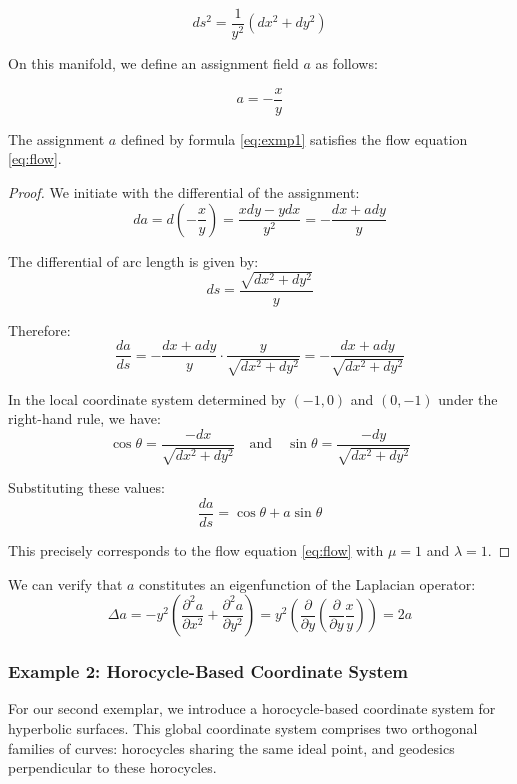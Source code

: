 $$
ds^2 = \frac{1}{y^2} (dx^2 + dy^2)
$$

On this manifold, we define an assignment field $a$ as follows:

\begin{equation}\label{eq:exmp1}
a = - \frac{x}{y}
\end{equation}

\begin{theorem}\label{thm:exmp1}
The assignment $a$ defined by formula \eqref{eq:exmp1} satisfies the flow equation \eqref{eq:flow}.
\end{theorem}

\begin{proof}
We initiate with the differential of the assignment:
$$
da = d\left(-\frac{x}{y}\right) = \frac{xdy - ydx}{y^2} = -\frac{dx + ady}{y}
$$

The differential of arc length is given by:
$$
ds = \frac{\sqrt{dx^2 + dy^2}}{y}
$$

Therefore:
$$
\frac{da}{ds} = - \frac{dx + ady}{y} \cdot \frac{y}{\sqrt{dx^2 + dy^2}} = - \frac{dx + ady}{\sqrt{dx^2 + dy^2}}
$$

In the local coordinate system determined by $(-1, 0)$ and $(0, -1)$ under the right-hand rule, we have:
$$
\cos \theta = \frac{-dx}{\sqrt{dx^2 + dy^2}} \quad \text{and} \quad \sin \theta = \frac{-dy}{\sqrt{dx^2 + dy^2}}
$$

Substituting these values:
$$
\frac{da}{ds} = \cos \theta + a \sin \theta
$$

This precisely corresponds to the flow equation \eqref{eq:flow} with $\mu=1$ and $\lambda=1$.
\end{proof}

We can verify that $a$ constitutes an eigenfunction of the Laplacian operator:
$$
\Delta a = - y^2 \left(\frac{\partial^2 a}{\partial x^2} + \frac{\partial^2 a}{\partial y^2}\right) = y^2 \left(\frac{\partial}{\partial y} \left(\frac{\partial}{\partial y} \frac{x}{y}\right)\right) = 2a
$$

\subsubsection{Example 2: Horocycle-Based Coordinate System}

For our second exemplar, we introduce a horocycle-based coordinate system for hyperbolic surfaces. This global coordinate system comprises two orthogonal families of curves: horocycles sharing the same ideal point, and geodesics perpendicular to these horocycles.

